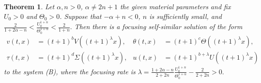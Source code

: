 \documentclass[a4paper,11pt]{article}
\newtheorem{theorem}{Theorem}[section]
\begin{document}
\begin{theorem} \label{thm_local}
Let $\alpha,n>0$, $\alpha\ne2n+1$ the given material parameters and fix $U_0>0$ and $\Theta_0>0$. Suppose that $-\alpha+n<0$, $n$ is sufficiently small, and
 $\frac{2}{1+2\alpha-n} < \frac{U_0^{1+n}}{\Theta_0^{1+\alpha}} < \frac{2}{1+n}.$
Then there is a focusing self-similar solution of the form
\begin{equation*}
\begin{aligned}
 v(t,x) &= (t+1)^b V((t+1)^\lambda x), &\theta(t,x) &= (t+1)^c \Theta((t+1)^\lambda x),\\
 \tau(t,x) &= (t+1)^d \Sigma((t+1)^\lambda x), & u(t,x) &= (t+1)^{b+\lambda} U((t+1)^\lambda x)
\end{aligned}
\end{equation*}
to the system (B), where the focusing rate is
 $\lambda = \frac{1+2\alpha-n}{2+2n}\frac{U_0^{1+n}}{\Theta_0^{1+\alpha}} - \frac{2}{2+2n}>0.$
\end{theorem}
\end{document}
